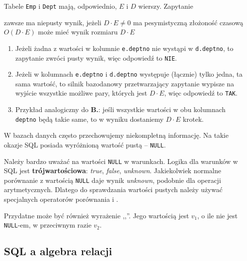 \begin{exam}
	Tabele \texttt{Emp} i \texttt{Dept} mają, odpowiednio, $E$ i $D$ wierszy. Zapytanie
	\begin{center}
	\end{center}
	\answers
	{zawsze ma niepusty wynik, jeżeli $D \cdot E  \neq 0$}
	{ma pesymistyczną złożoność czasową $O(D \cdot E)$}
	{może mieć wynik rozmiaru $D \cdot E$}
        \bigskip
	
	\begin{enumerate}[\bf A.]
		\item Jeżeli żadna z wartości w kolumnie \texttt{e.deptno} nie wystąpi w \texttt{d.deptno}, to zapytanie zwróci pusty wynik, więc odpowiedź to \texttt{NIE}.
		\item Jeżeli w kolumnach \texttt{e.deptno} i \texttt{d.deptno} występuje (łącznie) tylko jedna, ta sama wartość, to silnik bazodanowy przetwarzający zapytanie wypisze na wyjście wszystkie możliwe pary, których jest $D \cdot E$, więc odpowiedź to \texttt{TAK}.
		\item Przykład analogiczny do \textbf{B.}: jeśli wszystkie wartości w obu kolumnach \texttt{deptno} będą takie same, to w wyniku dostaniemy $D\cdot E$ krotek.
	\end{enumerate}
\end{exam}

W bazach danych często przechowujemy niekompletną informację. Na takie okazje SQL posiada wyróżnioną wartość pustą -- \texttt{NULL}.

Należy bardzo uważać na wartości \texttt{NULL} w warunkach. Logika dla warunków w SQL jest \textbf{trójwartościowa}: \textit{true}, \textit{false}, \textit{unknown}. Jakiekolwiek normalne porównanie z wartością \texttt{NULL} daje wynik \textit{unknown}, podobnie dla operacji arytmetycznych. Dlatego do sprawdzania wartości pustych należy używać specjalnych operatorów porównania
 i .

Przydatne może być również wyrażenie ,,''. Jego wartością jest $v_1$, o ile nie jest \texttt{NULL}-em, w przeciwnym razie $v_2$.

\subsection{SQL a algebra relacji} %

